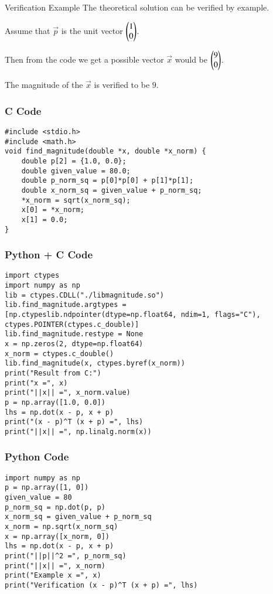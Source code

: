 \documentclass{beamer}
\begin{document}
\begin{frame}{Verification Example}
    The theoretical solution can be verified by example.
    
    \vfill
    
    Assume that $\vec{p}$ is the unit vector $\begin{pmatrix}1 \\ 0\end{pmatrix}$.
    
    \vfill

    Then from the code we get a possible vector $\vec{x}$ would be $\begin{pmatrix}9 \\ 0\end{pmatrix}$.
    
    \vfill
    
    The magnitude of the $\vec{x}$ is verified to be $9$.
    
    
\end{frame}

\begin{frame}[fragile]
    \frametitle{C Code}
    \begin{lstlisting}
#include <stdio.h>
#include <math.h>
void find_magnitude(double *x, double *x_norm) {
    double p[2] = {1.0, 0.0};
    double given_value = 80.0;
    double p_norm_sq = p[0]*p[0] + p[1]*p[1];
    double x_norm_sq = given_value + p_norm_sq;
    *x_norm = sqrt(x_norm_sq);
    x[0] = *x_norm;
    x[1] = 0.0;
}

    \end{lstlisting}
\end{frame}

\begin{frame}[fragile]
    \frametitle{Python + C Code}
    \begin{lstlisting}
import ctypes
import numpy as np
lib = ctypes.CDLL("./libmagnitude.so")
lib.find_magnitude.argtypes = [np.ctypeslib.ndpointer(dtype=np.float64, ndim=1, flags="C"), ctypes.POINTER(ctypes.c_double)]
lib.find_magnitude.restype = None
x = np.zeros(2, dtype=np.float64)
x_norm = ctypes.c_double()
lib.find_magnitude(x, ctypes.byref(x_norm))
print("Result from C:")
print("x =", x)
print("||x|| =", x_norm.value)
p = np.array([1.0, 0.0])
lhs = np.dot(x - p, x + p)
print("(x - p)^T (x + p) =", lhs)
print("||x|| =", np.linalg.norm(x))
    \end{lstlisting}
\end{frame}

\begin{frame}[fragile]
    \frametitle{Python Code}
    \begin{lstlisting}
import numpy as np
p = np.array([1, 0])
given_value = 80
p_norm_sq = np.dot(p, p)
x_norm_sq = given_value + p_norm_sq
x_norm = np.sqrt(x_norm_sq)
x = np.array([x_norm, 0])
lhs = np.dot(x - p, x + p)
print("||p||^2 =", p_norm_sq)
print("||x|| =", x_norm)
print("Example x =", x)
print("Verification (x - p)^T (x + p) =", lhs)

    \end{lstlisting}
\end{frame}
\end{document}
